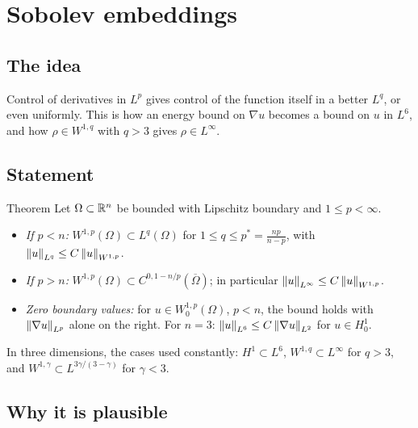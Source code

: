 
\section{Sobolev embeddings}\label{p:sobolev-embedding}


\subsection*{The idea}

Control of derivatives in $L^p$ gives control of the function itself in a better $L^q$, or even uniformly. This is how an energy bound on $\nabla u$ becomes a bound on $u$ in $L^6$, and how $\rho \in W^{1,q}$ with $q > 3$ gives $\rho \in L^\infty$.

\subsection*{Statement}

\begin{thmbox}{Theorem}
%
Let $\Omega\subset\mathbb{R}^n$ be bounded with Lipschitz boundary and $1\le p < \infty$.

\begin{itemize}
\item \emph{If $p < n$:} $W^{1,p}(\Omega)\subset L^{q}(\Omega)$ for $1 \le q \le p^* = \frac{np}{n-p}$, with $\left\lVert u\right\rVert_{L^{q}} \le C\left\lVert u\right\rVert_{W^{1,p}}$.
\item \emph{If $p > n$:} $W^{1,p}(\Omega)\subset C^{0,1-n/p}(\overline\Omega)$; in particular $\left\lVert u\right\rVert_{L^\infty}\le C\left\lVert u\right\rVert_{W^{1,p}}$.
\item \emph{Zero boundary values:} for $u\in W^{1,p}_0(\Omega)$, $p < n$, the bound holds with $\left\lVert \nabla u\right\rVert_{L^p}$ alone on the right. For $n=3$: $\left\lVert u\right\rVert_{L^6}\le C\left\lVert \nabla u\right\rVert_{L^2}$ for $u\in H^1_0$.
\end{itemize}
\end{thmbox}

In three dimensions, the cases used constantly: $H^1\subset L^6$, $W^{1,q}\subset L^\infty$ for $q> 3$, and $W^{1,\gamma}\subset L^{3\gamma/(3-\gamma)}$ for $\gamma< 3$.

\subsection*{Why it is plausible}

